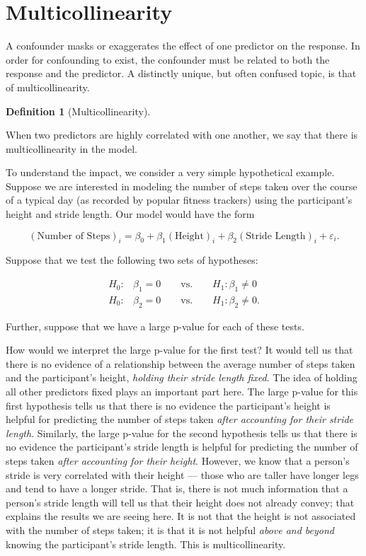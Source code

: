 \documentclass[
  letterpaper,
  DIV=11,
  numbers=noendperiod]{scrreprt}
\theoremstyle{definition}
\newtheorem{definition}{Definition}[chapter]
\theoremstyle{definition}
\theoremstyle{remark}
\begin{document}
\hypertarget{multicollinearity}{%
\section{Multicollinearity}\label{multicollinearity}}

A confounder masks or exaggerates the effect of one predictor on the
response. In order for confounding to exist, the confounder must be
related to both the response and the predictor. A distinctly unique, but
often confused topic, is that of multicollinearity.

\begin{definition}[Multicollinearity]\protect\hypertarget{def-multicollinearity}{}\label{def-multicollinearity}

When two predictors are highly correlated with one another, we say that
there is multicollinearity in the model.

\end{definition}

To understand the impact, we consider a very simple hypothetical
example. Suppose we are interested in modeling the number of steps taken
over the course of a typical day (as recorded by popular fitness
trackers) using the participant's height and stride length. Our model
would have the form

\[(\text{Number of Steps})_i = \beta_0 + \beta_1(\text{Height})_i + \beta_2(\text{Stride Length})_i + \varepsilon_i.\]

Suppose that we test the following two sets of hypotheses:

\[
\begin{aligned}
  H_0:& \beta_1 = 0 \qquad \text{vs.} \qquad H_1: \beta_1 \neq 0 \\
  H_0:& \beta_2 = 0 \qquad \text{vs.} \qquad H_1: \beta_2 \neq 0.
\end{aligned}
\]

Further, suppose that we have a large p-value for each of these tests.

How would we interpret the large p-value for the first test? It would
tell us that there is no evidence of a relationship between the average
number of steps taken and the participant's height, \emph{holding their
stride length fixed}. The idea of holding all other predictors fixed
plays an important part here. The large p-value for this first
hypothesis tells us that there is no evidence the participant's height
is helpful for predicting the number of steps taken \emph{after
accounting for their stride length}. Similarly, the large p-value for
the second hypothesis tells us that there is no evidence the
participant's stride length is helpful for predicting the number of
steps taken \emph{after accounting for their height}. However, we know
that a person's stride is very correlated with their height --- those
who are taller have longer legs and tend to have a longer stride. That
is, there is not much information that a person's stride length will
tell us that their height does not already convey; that explains the
results we are seeing here. It is not that the height is not associated
with the number of steps taken; it is that it is not helpful \emph{above
and beyond} knowing the participant's stride length. This is
multicollinearity.
\end{document}
